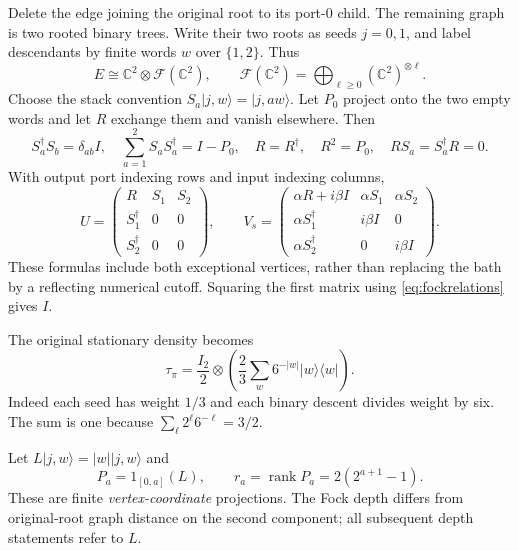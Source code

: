 \documentclass[11pt]{article}
\newcommand{\rank}{\operatorname{rank}}
\newcommand{\ket}[1]{\lvert #1\rangle}
\newcommand{\bra}[1]{\langle #1\rvert}
\begin{document}
Delete the edge joining the original root to its port-$0$ child. The remaining graph is two rooted binary trees. Write their two roots as seeds $j=0,1$, and label descendants by finite words $w$ over $\{1,2\}$. Thus
\[
 E\cong\mathbb C^2\otimes\mathcal F(\mathbb C^2),\qquad
 \mathcal F(\mathbb C^2)=\bigoplus_{\ell\ge0}(\mathbb C^2)^{\otimes\ell}.
\]
Choose the stack convention $S_a\ket{j,w}=\ket{j,aw}$. Let $P_0$ project onto the two empty words and let $R$ exchange them and vanish elsewhere. Then
\begin{equation}
 S_a^\dagger S_b=\delta_{ab}I,\quad
 \sum_{a=1}^2S_aS_a^\dagger=I-P_0,\quad R=R^\dagger,\quad R^2=P_0,
 \quad RS_a=S_a^\dagger R=0.\label{eq:fockrelations}
\end{equation}
With output port indexing rows and input indexing columns,
\begin{equation}
 U=\begin{pmatrix}R&S_1&S_2\\S_1^\dagger&0&0\\S_2^\dagger&0&0\end{pmatrix},
 \qquad
 V_s=\begin{pmatrix}\alpha R+i\beta I&\alpha S_1&\alpha S_2\\
 \alpha S_1^\dagger&i\beta I&0\\\alpha S_2^\dagger&0&i\beta I\end{pmatrix}.
 \label{eq:matrix}
\end{equation}
These formulas include both exceptional vertices, rather than replacing the bath by a reflecting numerical cutoff. Squaring the first matrix using \eqref{eq:fockrelations} gives $I$.

The original stationary density becomes
\begin{equation}
 \tau_\pi=\frac{I_2}{2}\otimes
 \left(\frac23\sum_w6^{-|w|}\ket w\bra w\right).
 \label{eq:stationaryfock}
\end{equation}
Indeed each seed has weight $1/3$ and each binary descent divides weight by six. The sum is one because $\sum_\ell2^\ell6^{-\ell}=3/2$.

Let $L\ket{j,w}=|w|\ket{j,w}$ and
\begin{equation}
 P_a=1_{[0,a]}(L),\qquad r_a=\rank P_a=2(2^{a+1}-1).
 \label{eq:rankcutoff}
\end{equation}
These are finite \emph{vertex-coordinate} projections. The Fock depth differs from original-root graph distance on the second component; all subsequent depth statements refer to $L$.
\end{document}
